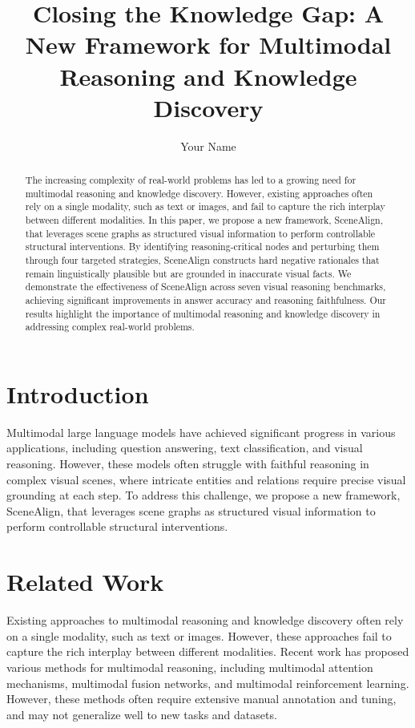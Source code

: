 \documentclass{article}
\title{Closing the Knowledge Gap: A New Framework for Multimodal Reasoning and Knowledge Discovery}
\author{Your Name}
\begin{document}
\maketitle

\begin{abstract}
The increasing complexity of real-world problems has led to a growing need for multimodal reasoning and knowledge discovery. However, existing approaches often rely on a single modality, such as text or images, and fail to capture the rich interplay between different modalities. In this paper, we propose a new framework, SceneAlign, that leverages scene graphs as structured visual information to perform controllable structural interventions. By identifying reasoning-critical nodes and perturbing them through four targeted strategies, SceneAlign constructs hard negative rationales that remain linguistically plausible but are grounded in inaccurate visual facts. We demonstrate the effectiveness of SceneAlign across seven visual reasoning benchmarks, achieving significant improvements in answer accuracy and reasoning faithfulness. Our results highlight the importance of multimodal reasoning and knowledge discovery in addressing complex real-world problems.
\end{abstract}

\section{Introduction}

Multimodal large language models have achieved significant progress in various applications, including question answering, text classification, and visual reasoning. However, these models often struggle with faithful reasoning in complex visual scenes, where intricate entities and relations require precise visual grounding at each step. To address this challenge, we propose a new framework, SceneAlign, that leverages scene graphs as structured visual information to perform controllable structural interventions.

\section{Related Work}

Existing approaches to multimodal reasoning and knowledge discovery often rely on a single modality, such as text or images. However, these approaches fail to capture the rich interplay between different modalities. Recent work has proposed various methods for multimodal reasoning, including multimodal attention mechanisms, multimodal fusion networks, and multimodal reinforcement learning. However, these methods often require extensive manual annotation and tuning, and may not generalize well to new tasks and datasets.
\end{document}
